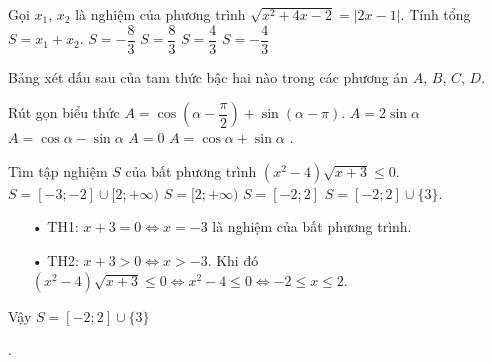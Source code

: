 \begin{ex}%
	Gọi $x_1$, $x_2$ là nghiệm của phương trình $\sqrt{x^2+4x-2}=|2x-1|$. Tính tổng $S=x_1+x_2$.
	\choice
	{$S=-\dfrac{8}{3}$}
	{ \True $S=\dfrac{8}{3}$}
	{$S=\dfrac{4}{3}$}
	{$S=-\dfrac{4}{3}$}
	
\end{ex}
\begin{ex}%
	Bảng xét dấu sau của tam thức bậc hai nào trong các phương án $A$, $B$, $C$, $D$.
\end{ex}
\begin{ex}%
	Rút gọn biểu thức $A=\cos \left( \alpha -\dfrac{\pi}{2} \right) +\sin \left( \alpha-\pi \right)$.
	\choice
	{$A=2\sin \alpha$}
	{$A=\cos \alpha -\sin \alpha $}
	{\True $A=0$}
	{$A=\cos \alpha+\sin \alpha$}
	.
\end{ex}
\begin{ex}%
	Tìm tập nghiệm $S$ của bất phương trình $(x^2-4)\sqrt{x+3} \leq 0$.
	\choice
	{$S=[-3; -2] \cup [2; + \infty)$}
	{$S=[2; +\infty)$}
	{$S=[-2; 2]$}
	{\True $S=[-2; 2] \cup \lbrace 3 \rbrace $.}
	\loigiai
	{
		\begin{enumerate}
			\item[•] TH1: $x+3=0 \Leftrightarrow x=-3$ là nghiệm của bất phương trình.
			\item[•] TH2: $x+3>0 \Leftrightarrow x >-3$. Khi đó
			$(x^2-4)\sqrt{x+3} \leq 0 \Leftrightarrow x^2-4 \leq 0 \Leftrightarrow -2 \leq x \leq 2$.
		\end{enumerate}
		Vậy $S=[-2; 2] \cup \lbrace 3 \rbrace $}
\end{ex}.
